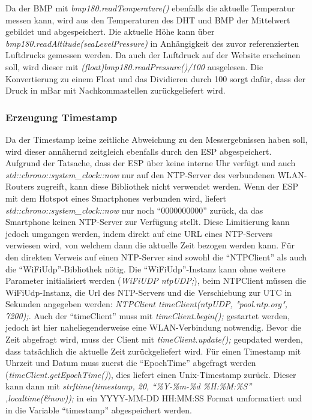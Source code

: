 	Da der BMP mit \textit{bmp180.readTemperature()} ebenfalls die aktuelle Temperatur messen kann, wird aus den Temperaturen des DHT und BMP der Mittelwert gebildet und abgespeichert.
	Die aktuelle Höhe kann über \textit{bmp180.readAltitude(seaLevelPressure)} in Anhängigkeit des zuvor referenzierten Luftdrucks gemessen werden.
	Da auch der Luftdruck auf der Website erscheinen soll, wird dieser mit \textit{(float)bmp180.readPressure()/100} ausgelesen.
	Die Konvertierung zu einem Float und das Dividieren durch 100 sorgt dafür, dass der Druck in mBar mit Nachkommastellen zurückgeliefert wird.

\subsubsection{Erzeugung Timestamp}
	Da der Timestamp keine zeitliche Abweichung zu den Messergebnissen haben soll, wird dieser annähernd zeitgleich ebenfalls durch den ESP abgespeichert.
	Aufgrund der Tatsache, dass der ESP über keine interne Uhr verfügt und auch \textit{std::chrono::system\_clock::now} nur auf den NTP-Server des verbundenen WLAN-Routers zugreift, kann diese Bibliothek nicht verwendet werden. Wenn der ESP mit dem Hotspot eines Smartphones verbunden wird, liefert \textit{std::chrono::system\_clock::now} nur noch "`0000000000"' zurück, da das Smartphone keinen NTP-Server zur Verfügung stellt.
	Diese Limitierung kann jedoch umgangen werden, indem direkt auf eine URL eines NTP-Servers verwiesen wird, von welchem dann die aktuelle Zeit bezogen werden kann.
	Für den direkten Verweis auf einen NTP-Server sind sowohl die "`NTPClient"' als auch die "`WiFiUdp"'-Bibliothek nötig.
	Die "`WiFiUdp"'-Instanz kann ohne weitere Parameter initialisiert werden (\textit{WiFiUDP ntpUDP;}), beim NTPClient müssen die WiFiUdp-Instanz, die Url des NTP-Servers und die Verschiebung zur UTC in Sekunden angegeben werden: \textit{NTPClient timeClient(ntpUDP, "pool.ntp.org", 7200);}.
	Auch der "`timeClient"' muss mit \textit{timeClient.begin();} gestartet werden, jedoch ist hier naheliegenderweise eine WLAN-Verbindung notwendig.
	Bevor die Zeit abgefragt wird, muss der Client mit \textit{timeClient.update();} geupdated werden, dass tatsächlich die aktuelle Zeit zurückgeliefert wird.
	Für einen Timestamp mit Uhrzeit und Datum muss zuerst die "`EpochTime"' abgefragt werden (\textit{timeClient.getEpochTime()}), dies liefert einen Unix-Timestamp zurück.
	Dieser kann dann mit \textit{strftime(timestamp, 20, "`\%Y-\%m-\%d \%H:\%M:\%S"' ,localtime(\&now));} in ein YYYY-MM-DD HH:MM:SS Format umformatiert und in die Variable "`timestamp"' abgespeichert werden.
	